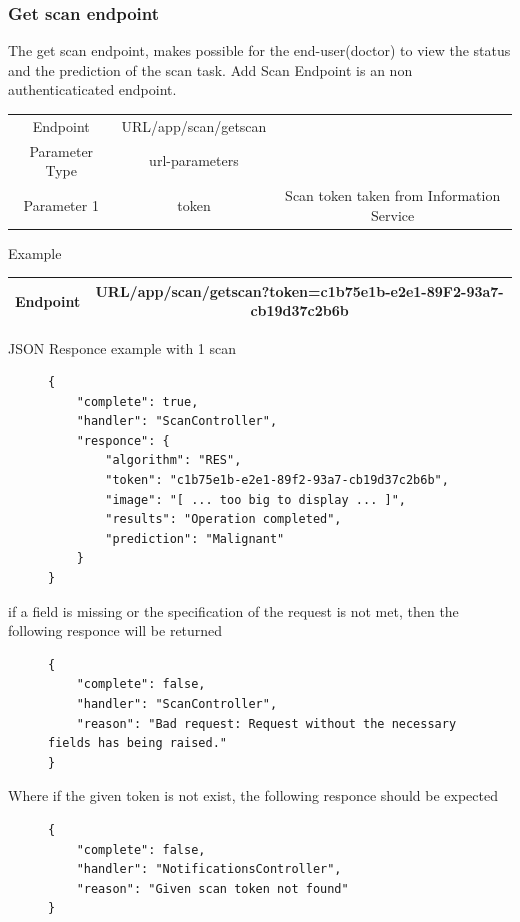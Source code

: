 				\subsubsection{Get scan endpoint}
					The get scan  endpoint, makes possible for the end-user(doctor) to view the status and the prediction of the scan task.
					Add Scan Endpoint is an non authenticaticated endpoint.
					\begin{center}
						\begin{tabular}{ |c|c|c| } 
							\hline
							Endpoint & {{URL}}/app/scan/getscan& \\
							Parameter Type & url-parameters  &\\
							Parameter 1 & token  &Scan token taken from Information Service\\
							\hline
						\end{tabular}
					\end{center}
					Example
					\begin{center}
						\begin{tabular}{ |c|c| } 
							\hline
							Endpoint & {{URL}}/app/scan/getscan?token=c1b75e1b-e2e1-89F2-93a7-cb19d37c2b6b\\
							\hline
						\end{tabular}
					\end{center}
					JSON Responce example with 1 scan
					\begin{figure}[H]
						\iftrue
						\begin{lstlisting}[]
{
	"complete": true,
	"handler": "ScanController",
	"responce": {
		"algorithm": "RES",
		"token": "c1b75e1b-e2e1-89f2-93a7-cb19d37c2b6b",
		"image": "[ ... too big to display ... ]",
		"results": "Operation completed",
		"prediction": "Malignant"
	}
}
						\end{lstlisting}
					\end{figure}
					if a field is missing or the specification of the request is not met, then the following responce will be returned
					\begin{figure}[H]
						\iftrue
						\begin{lstlisting}[]
{
	"complete": false,
	"handler": "ScanController",
	"reason": "Bad request: Request without the necessary fields has being raised."
}					
						\end{lstlisting}
					\end{figure}
					Where if the given token is not exist, the following responce should be expected
					\begin{figure}[H]
						\iftrue
						\begin{lstlisting}[]
{
	"complete": false,
	"handler": "NotificationsController",
	"reason": "Given scan token not found"
}		
						\end{lstlisting}
					\end{figure}
